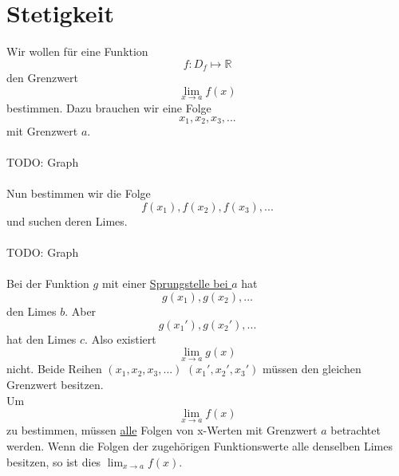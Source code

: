 \documentclass{report}
\begin{document}
\section{Stetigkeit}
Wir wollen für eine Funktion
\begin{equation}f: D_f \mapsto \mathbb{R}\end{equation}
den Grenzwert
\begin{equation}\lim_{x \to a} f(x)\end{equation}
bestimmen. Dazu brauchen wir eine Folge
\begin{equation}x_1, x_2, x_3, ...\end{equation}
mit Grenzwert $a$.
\\\\TODO: Graph\\\\
Nun bestimmen wir die Folge
\begin{equation}f(x_1), f(x_2), f(x_3), ...\end{equation}
und suchen deren Limes.
\\\\TODO: Graph\\\\
Bei der Funktion $g$ mit einer \underline{Sprungstelle bei $a$} hat
\begin{equation}g(x_1), g(x_2), ...\end{equation}
den Limes $b$. Aber
\begin{equation}g({x_1}'), g({x_2}'), ...\end{equation}
hat den Limes $c$. Also existiert
\begin{equation}\lim_{x \to a} g(x)\end{equation}
nicht. Beide Reihen $(x_1, x_2, x_3, ...)$ $({x_1}', {x_2}', {x_3}')$ müssen den gleichen Grenzwert besitzen.\\
Um
\begin{equation}\lim_{x \to a} f(x)\end{equation}
zu bestimmen, müssen \underline{alle} Folgen von x-Werten mit Grenzwert $a$ betrachtet werden. Wenn die Folgen der zugehörigen Funktionswerte alle denselben Limes besitzen, so ist dies $\lim_{x \to a} f(x)$.
\end{document}
